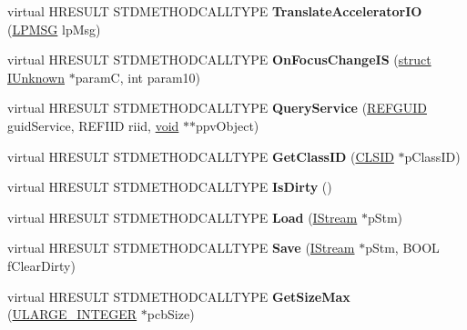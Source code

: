 \begin{DoxyCompactItemize}
virtual H\+R\+E\+S\+U\+LT S\+T\+D\+M\+E\+T\+H\+O\+D\+C\+A\+L\+L\+T\+Y\+PE {\bfseries Translate\+Accelerator\+IO} (\hyperlink{structtag_m_s_g}{L\+P\+M\+SG} lp\+Msg)
\item 
\mbox{\label{class_c_band_site_base_abd3518935d5a491f5f06cba5c7345186}} 
virtual H\+R\+E\+S\+U\+LT S\+T\+D\+M\+E\+T\+H\+O\+D\+C\+A\+L\+L\+T\+Y\+PE {\bfseries On\+Focus\+Change\+IS} (\hyperlink{interfacestruct}{struct} \hyperlink{interface_i_unknown}{I\+Unknown} $\ast$paramC, int param10)
\item 
\mbox{\label{class_c_band_site_base_a6cd054693066bc72a5f9d1180f9b7c66}} 
virtual H\+R\+E\+S\+U\+LT S\+T\+D\+M\+E\+T\+H\+O\+D\+C\+A\+L\+L\+T\+Y\+PE {\bfseries Query\+Service} (\hyperlink{struct___g_u_i_d}{R\+E\+F\+G\+U\+ID} guid\+Service, R\+E\+F\+I\+ID riid, \hyperlink{interfacevoid}{void} $\ast$$\ast$ppv\+Object)
\item 
\mbox{\label{class_c_band_site_base_a4c936dee652ace2d17409b3aca4670e4}} 
virtual H\+R\+E\+S\+U\+LT S\+T\+D\+M\+E\+T\+H\+O\+D\+C\+A\+L\+L\+T\+Y\+PE {\bfseries Get\+Class\+ID} (\hyperlink{struct___i_i_d}{C\+L\+S\+ID} $\ast$p\+Class\+ID)
\item 
\mbox{\label{class_c_band_site_base_aac0833fe04ba1a6d9af4bd1e2f5b2a1b}} 
virtual H\+R\+E\+S\+U\+LT S\+T\+D\+M\+E\+T\+H\+O\+D\+C\+A\+L\+L\+T\+Y\+PE {\bfseries Is\+Dirty} ()
\item 
\mbox{\label{class_c_band_site_base_ac751a228baa40673fcc7d7fd9372ff5b}} 
virtual H\+R\+E\+S\+U\+LT S\+T\+D\+M\+E\+T\+H\+O\+D\+C\+A\+L\+L\+T\+Y\+PE {\bfseries Load} (\hyperlink{interface_i_stream}{I\+Stream} $\ast$p\+Stm)
\item 
\mbox{\label{class_c_band_site_base_a92ae876b39f97e8477fd2b4c34b1569b}} 
virtual H\+R\+E\+S\+U\+LT S\+T\+D\+M\+E\+T\+H\+O\+D\+C\+A\+L\+L\+T\+Y\+PE {\bfseries Save} (\hyperlink{interface_i_stream}{I\+Stream} $\ast$p\+Stm, B\+O\+OL f\+Clear\+Dirty)
\item 
\mbox{\label{class_c_band_site_base_a753e21bf7be910b23960fd8a4a511047}} 
virtual H\+R\+E\+S\+U\+LT S\+T\+D\+M\+E\+T\+H\+O\+D\+C\+A\+L\+L\+T\+Y\+PE {\bfseries Get\+Size\+Max} (\hyperlink{struct___u_l_a_r_g_e___i_n_t_e_g_e_r}{U\+L\+A\+R\+G\+E\+\_\+\+I\+N\+T\+E\+G\+ER} $\ast$pcb\+Size)
$$
\end{DoxyCompactItemize}

